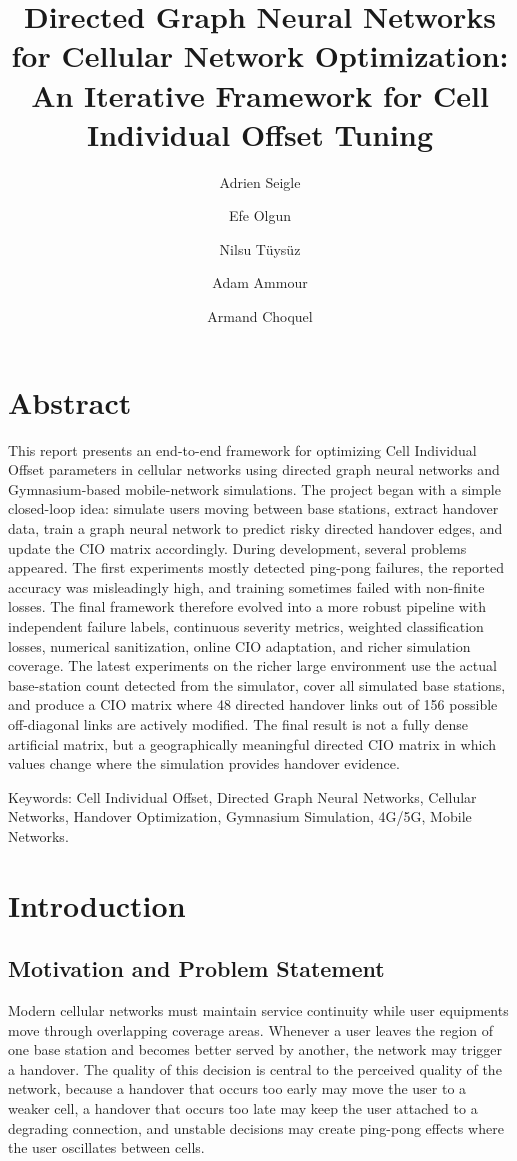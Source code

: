 \documentclass[11pt, a4paper, twoside]{article}
\title{Directed Graph Neural Networks for Cellular Network Optimization:\\
An Iterative Framework for Cell Individual Offset Tuning}
\author{Adrien Seigle \and Efe Olgun \and Nilsu Tüysüz \and Adam Ammour \and Armand Choquel}
\begin{document}
\maketitle

\section*{Abstract}

This report presents an end-to-end framework for optimizing Cell Individual Offset parameters in cellular networks using directed graph neural networks and Gymnasium-based mobile-network simulations. The project began with a simple closed-loop idea: simulate users moving between base stations, extract handover data, train a graph neural network to predict risky directed handover edges, and update the CIO matrix accordingly. During development, several problems appeared. The first experiments mostly detected ping-pong failures, the reported accuracy was misleadingly high, and training sometimes failed with non-finite losses. The final framework therefore evolved into a more robust pipeline with independent failure labels, continuous severity metrics, weighted classification losses, numerical sanitization, online CIO adaptation, and richer simulation coverage. The latest experiments on the richer large environment use the actual base-station count detected from the simulator, cover all simulated base stations, and produce a CIO matrix where 48 directed handover links out of 156 possible off-diagonal links are actively modified. The final result is not a fully dense artificial matrix, but a geographically meaningful directed CIO matrix in which values change where the simulation provides handover evidence.

\vspace{0.5cm}
Keywords: Cell Individual Offset, Directed Graph Neural Networks, Cellular Networks, Handover Optimization, Gymnasium Simulation, 4G/5G, Mobile Networks.

\newpage

\section{Introduction}
\label{sec:introduction}

\subsection{Motivation and Problem Statement}

Modern cellular networks must maintain service continuity while user equipments move through overlapping coverage areas. Whenever a user leaves the region of one base station and becomes better served by another, the network may trigger a handover. The quality of this decision is central to the perceived quality of the network, because a handover that occurs too early may move the user to a weaker cell, a handover that occurs too late may keep the user attached to a degrading connection, and unstable decisions may create ping-pong effects where the user oscillates between cells.
\end{document}
